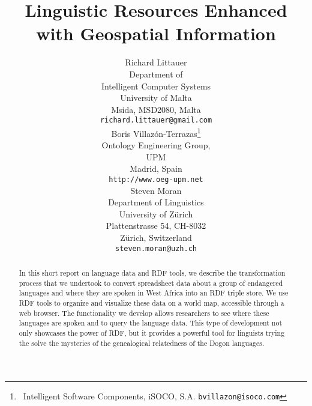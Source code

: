 \documentclass[11pt]{article}
\title{Linguistic Resources Enhanced with Geospatial Information}
\author{Richard Littauer \\
Department of \\
Intelligent Computer Systems \\
University of Malta \\ 
Msida, MSD2080, Malta \\
  {\tt \small richard.littauer@gmail.com} \\\And
   Boris Villaz\'on-Terrazas\thanks{\ Intelligent Software Components, iSOCO, S.A. {\tt \small bvillazon@isoco.com} } \\
   Ontology Engineering Group,\\
   UPM \\
   Madrid, Spain \\
{\tt \small http://www.oeg-upm.net} \\\And
Steven Moran \\
Department of Linguistics \\
 University of Z\"urich \\
  Plattenstrasse 54, CH-8032 \\
  Z\"urich, Switzerland \\
  {\tt \small steven.moran@uzh.ch} \\}
\date{}
\begin{document}
\maketitle
\begin{abstract}

In this short report on language data and RDF tools, we describe the transformation process that we undertook to convert spreadsheet data about a group of endangered languages and where they are spoken in West Africa into an RDF triple store. We use RDF tools to organize and visualize these data on a world map, accessible through a web browser. The functionality we develop allows researchers to see where these languages are spoken and to query the language data. This type of development not only showcases the power of RDF, but it provides a powerful tool for linguists trying the solve the mysteries of the genealogical relatedness of the Dogon languages.

\end{abstract}
\end{document}
